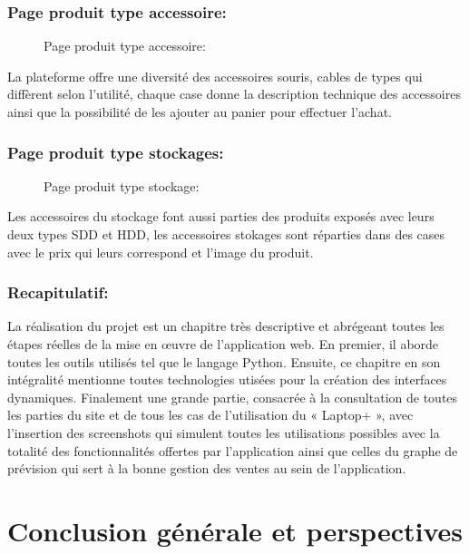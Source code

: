 \documentclass[a4paper]{report}
\begin{document}
\begin{doublespace}
	\subsection{Page produit type accessoire:}
	\begin{figure}[H]
		\begin{center}
			\caption{Page produit type accessoire:}
		\end{center}
	\end{figure}
	
	La plateforme offre une diversité des accessoires
	souris, cables de types qui diffèrent selon l'utilité, chaque case donne la
	description technique des accessoires ainsi que la possibilité de les ajouter
	au panier pour effectuer l'achat.
	
	\subsection{Page produit type stockages:}
	\begin{figure}[H]
		\begin{center}
			\caption{Page produit type stockage:}
		\end{center}
	\end{figure}
	
	Les accessoires du stockage font aussi parties des
	produits exposés avec leurs deux types SDD et HDD, les accessoires stokages
	sont réparties dans des cases avec le prix qui leurs correspond et l'image du
	produit.
	\subsection{Recapitulatif:}
	La réalisation du projet est un chapitre très
	descriptive et abrégeant toutes les étapes réelles de la mise en œuvre de
	l'application web. En premier, il aborde toutes les outils utilisés tel que le
	langage  Python. Ensuite, ce chapitre en son intégralité mentionne toutes
	technologies utisées pour la création des interfaces dynamiques. Finalement une
	grande partie, consacrée à la consultation de toutes les parties du site et de
	tous les cas de l’utilisation du « Laptop+ », avec l’insertion des screenshots
	qui simulent toutes les utilisations possibles avec la totalité des
	fonctionnalités offertes par l'application ainsi que celles du graphe de
	prévision qui sert à la bonne gestion des ventes au sein de l'application.
	\chapter{Conclusion générale et perspectives}
	\fancyhead[L]{\hspace*{5cm}}

\end{doublespace}
\end{document}
